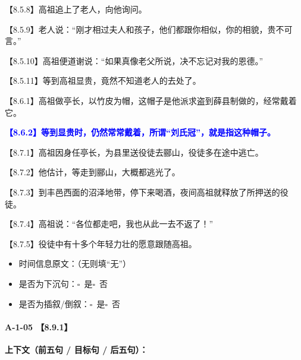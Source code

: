 \documentclass[fontset=none,11pt,a4paper]{ctexart}
\newcommand{\answerline}[1]{\underline{\hspace{#1}}}
\newcommand{\choicebox}[1]{$\square$~#1}
\begin{document}
\noindent 【8.5.8】高祖追上了老人，向他询问。\par
\noindent 【8.5.9】老人说：“刚才相过夫人和孩子，他们都跟你相似，你的相貌，贵不可言。”\par
\noindent 【8.5.10】高祖便道谢说：“如果真像老父所说，决不忘记对我的恩德。”\par
\noindent 【8.5.11】等到高祖显贵，竟然不知道老人的去处了。\par
\noindent 【8.6.1】高祖做亭长，以竹皮为帽，这帽子是他派求盗到薛县制做的，经常戴着它。\par
\noindent \textcolor{blue}{\textbf{【8.6.2】等到显贵时，仍然常常戴着，所谓“刘氏冠”，就是指这种帽子。}}\par
\noindent 【8.7.1】高祖因身任亭长，为县里送役徒去郦山，役徒多在途中逃亡。\par
\noindent 【8.7.2】他估计，等走到郦山，大概都逃光了。\par
\noindent 【8.7.3】到丰邑西面的沼泽地带，停下来喝酒，夜间高祖就释放了所押送的役徒。\par
\noindent 【8.7.4】高祖说：“各位都走吧，我也从此一去不返了！”\par
\noindent 【8.7.5】役徒中有十多个年轻力壮的愿意跟随高祖。\par

\begin{itemize}
  \item 时间信息原文：\answerline{7.5cm}（无则填“无”）
  \item 是否为下沉句：\choicebox{是}\quad \choicebox{否}
  \item 是否为插叙/倒叙：\choicebox{是}\quad \choicebox{否}
\end{itemize}

\paragraph{A-1-05 \quad 【8.9.1】}
\textbf{上下文（前五句 / 目标句 / 后五句）：}
\end{document}
